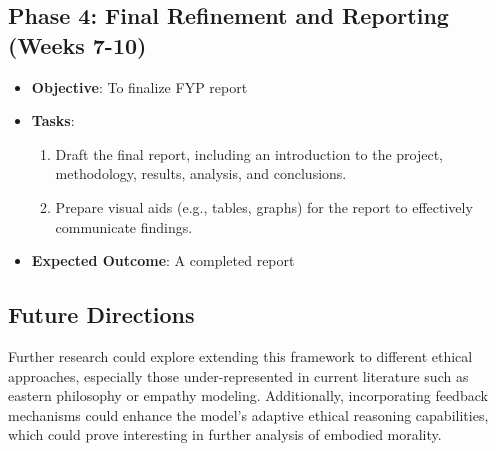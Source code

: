 \documentclass{article}
\begin{document}
\subsection{Phase 4: Final Refinement and Reporting (Weeks 7-10)}

\begin{itemize}
    \item \textbf{Objective}: To finalize FYP report
    \item \textbf{Tasks}:
        \begin{enumerate}
            \item Draft the final report, including an introduction to the project, methodology, results, analysis, and conclusions.
            \item Prepare visual aids (e.g., tables, graphs) for the report to effectively communicate findings.
        \end{enumerate}
    \item \textbf{Expected Outcome}: A completed report
\end{itemize}


\subsection{Future Directions}

Further research could explore extending this framework to different ethical approaches, especially those under-represented in current literature such as eastern philosophy or empathy modeling. Additionally, incorporating feedback mechanisms could enhance the model's adaptive ethical reasoning capabilities, which could prove interesting in further analysis of embodied morality.





\end{document}
